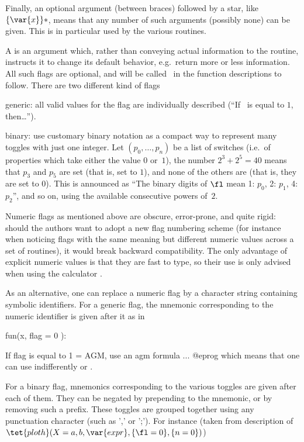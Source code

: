 Finally, an optional argument (between braces) followed by a star, like
$\{\var{x}\}*$, means that any number of such arguments (possibly none) can
be given. This is in particular used by the various  routines.

 A  is an argument which, rather than conveying
actual information to the routine, instructs it to change its default
behavior, e.g.~return more or less information. All such
flags are optional, and will be called \fl\ in the function descriptions to
follow. There are two different kind of flags

\item generic: all valid values for the flag are individually
described (``If \fl\ is equal to $1$, then\dots'').

\item binary: use customary binary notation as a
compact way to represent many toggles with just one integer. Let
$(p_0,\dots,p_n)$ be a list of switches (i.e.~of properties which take either
the value $0$ or~$1$), the number $2^3 + 2^5 = 40$ means that $p_3$ and $p_5$
are set (that is, set to $1$), and none of the others are (that is, they
are set to $0$). This is announced as ``The binary digits of $\fl$ mean 1:
$p_0$, 2: $p_1$, 4: $p_2$'', and so on, using the available consecutive
powers of~$2$.

 Numeric flags as mentioned above are
obscure, error-prone, and quite rigid: should the authors
want to adopt a new flag numbering scheme (for instance when noticing
flags with the same meaning but different numeric values across a set of
routines), it would break backward compatibility. The only advantage of
explicit numeric values is that they are fast to type, so their use is only
advised when using the calculator .

As an alternative, one can replace a numeric flag by a character string
containing symbolic identifiers. For a generic flag, the mnemonic
corresponding to the numeric identifier is given after it as in

\bprog
fun(x, {flag = 0} ):

  If flag is equal to 1 = AGM, use an agm formula ...
@eprog\noindent
which means that one can use indifferently  or
.

For a binary flag, mnemonics corresponding to the various toggles are given
after each of them. They can be negated by prepending  to the
mnemonic, or by removing such a prefix. These toggles are grouped together
using any punctuation character (such as ',' or ';'). For instance (taken
from description of $\tet{ploth}(X=a,b,\var{expr},\{\fl=0\},\{n=0\})$)

